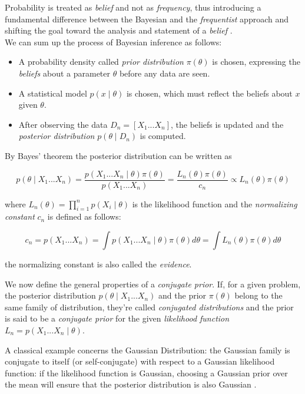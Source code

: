 \documentclass[12pt,openright,twoside,a4paper]{book}
\begin{document}
Probability is treated as \textit{belief} and not as \textit{frequency}, thus introducing a fundamental difference between the Bayesian and the \textit{frequentist} approach and shifting the goal toward the analysis and statement of a \textit{belief} \cite{SML}.
\\[12pt]
We can sum up the process of Bayesian inference as follows:
\begin{itemize}
\item A probability density called \textit{prior distribution} $\pi(\theta)$ is chosen, expressing the \textit{beliefs} about a parameter $\theta$ before any data are seen.
\item A statistical model $p(x\mid \theta)$ is chosen, which must reflect the beliefs about $x$ given $\theta$.
\item After observing the data $D_n=[X_1...X_n]$, the beliefs is updated and the \textit{posterior distribution} $p(\theta\mid D_n)$ is computed.
\end{itemize}

By Bayes' theorem the posterior distribution can be written as 

\begin{equation}
p(\theta\mid X_1...X_n)= \frac{p(X_1...X_n\mid \theta)\pi(\theta)}{p(X_1...X_n)}=\frac{L_n(\theta)\pi(\theta)}{c_n}\propto L_n(\theta)\pi(\theta)
\label{bayest}
\end{equation}

where $L_n(\theta)=\prod_{i=1}^n p(X_i\mid \theta)$ is the likelihood function and the \textit{normalizing constant} $c_n$ is defined as follows:

\begin{equation}
c_n=p(X_1...X_n)=\int p(X_1...X_n\mid \theta)\pi(\theta)d\theta=\int L_n(\theta)\pi(\theta)d\theta
\label{cnorm}
\end{equation}

the normalizing constant is also called the \textit{evidence}.

We now define the general properties of a \textit{conjugate prior}.
If, for a given problem, the posterior distribution $p(\theta\mid X_1...X_n)$ and the prior $\pi(\theta)$ belong to the same family of distribution, they're called \textit{conjugated distributions} and the prior is said to be a \textit{conjugate prior} for the given \textit{likelihood function} $L_n=p(X_1...X_n\mid \theta)$.

A classical example concerns the Gaussian Distribution: the Gaussian family is conjugate to itself (or self-conjugate) with respect to a Gaussian likelihood function: if the likelihood function is Gaussian, choosing a Gaussian prior over the mean will ensure that the posterior distribution is also Gaussian \cite{CBA}.
\end{document}
